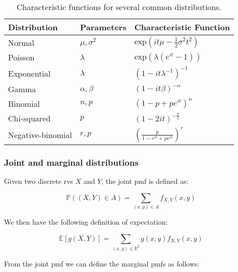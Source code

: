 \documentclass{report}
\renewcommand{\arraystretch}{1.5}
\begin{document}
\renewcommand{\arraystretch}{2}

\begin{table}[h!]
\centering
\begin{tabular}{||l l l||} 
 \hline
 \textbf{Distribution} & \textbf{Parameters} & \textbf{Characteristic Function} \\ [0.5ex] 
  \hline\hline
  Normal & $\mu, \sigma^2$ & $\text{exp}\left(it\mu -\frac{1}{2}\sigma^2t^2\right)$ \\
  \hline
  Poisson & $\lambda$ & $\text{exp}\left(\lambda(e^{it} - 1)\right)$ \\
  \hline
  Exponential & $\lambda$ & $\left(1 - it\lambda^{-1}\right)^{-1}$ \\
  \hline 
  Gamma & $\alpha, \beta$ & $\left(1 - it\beta\right)^{-\alpha}$ \\
  \hline 
  Binomial & $n, p$ & $\left(1 - p + pe^{it}\right)^n$ \\
  \hline 
  Chi-squared & $p$ & $(1 - 2it)^{-\frac{p}{2}}$ \\
  \hline 
  Negative-binomial & $r, p$ & $\left(\frac{p}{1 - e^{it} + pe^{it}}\right)^r$ \\
  \hline 
\end{tabular}
\caption{Characteristic functions for several common distributions.}
\label{table:characteristic-functions}
\end{table}

\renewcommand{\arraystretch}{1.5}

\subsubsection{Joint and marginal distributions}

Given two discrete \glspl{rv} $X$ and $Y$, the joint \gls{pmf} is defined as:

\begin{equation}\label{eq:joint-pmf}
    \mathbb{P}((X, Y) \in A) = \sum_{(x,y) \in A} f_{X, Y}(x, y)
\end{equation}

We then have the following definition of expectation:

\begin{equation}\label{eq:joint-expectation-discrete}
    \mathbb{E}[g(X,Y)] = \sum_{(x,y) \in \mathbb{R}^2} g(x,y)f_{X, Y}(x,y)
\end{equation}

From the joint \gls{pmf} we can define the marginal \glspl{pmf} as follows:
\end{document}
